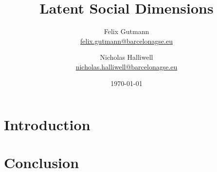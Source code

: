 \documentclass[11pt,letterpaper]{article}
\author{
	Felix Gutmann\\
	\href{mailto:felix.gutmann@barcelonagse.eu}{felix.gutmann@barcelonagse.eu}
	\and
	Nicholas Halliwell\\
	\href{mailto:nicholas.halliwell@barcelonagse.eu}{nicholas.halliwell@barcelonagse.eu}}
\title{Latent Social Dimensions}
\date{\today}
\begin{document}
\maketitle


\begin{abstract}
\noindent
\end{abstract}


\section*{Introduction} 



\section*{Conclusion}


\begin{thebibliography}{99} 
	
	
	
\end{thebibliography}
\end{document}
